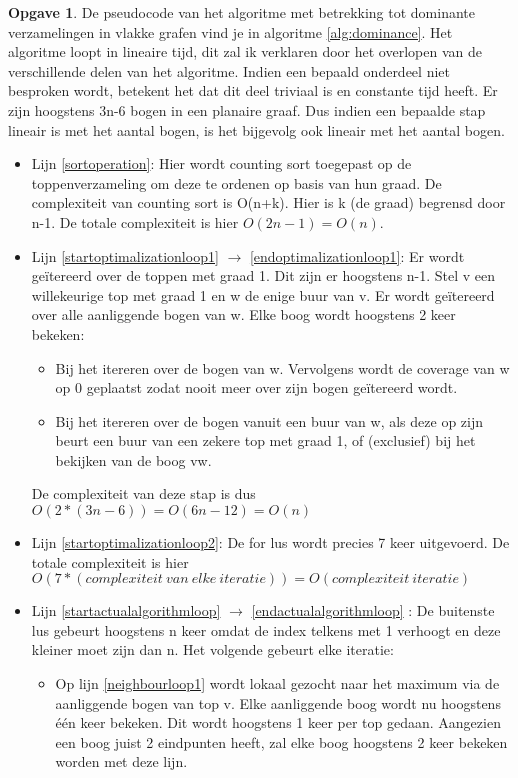\documentclass[11pt, a4paper, table]{article}
\theoremstyle{definition}
\newtheorem{opgave}{Opgave}
\theoremstyle{definition}
\theoremstyle{definition}
\begin{document}
\begin{opgave}
		De pseudocode van het algoritme met betrekking tot dominante verzamelingen in vlakke grafen vind je in algoritme \ref{alg:dominance}. Het algoritme loopt in lineaire tijd, dit zal ik verklaren door het overlopen van de verschillende delen van het algoritme. Indien een bepaald onderdeel niet besproken wordt, betekent het dat dit deel triviaal is en constante tijd heeft. Er zijn hoogstens 3n-6 bogen in een planaire graaf. Dus indien een bepaalde stap lineair is met het aantal bogen, is het bijgevolg ook lineair met het aantal bogen. 
		\begin{itemize}
			 \item Lijn \ref{sortoperation}: Hier wordt counting sort toegepast op de toppenverzameling om deze te ordenen op basis van hun graad. De complexiteit van counting sort is O(n+k). Hier is k (de graad) begrensd door n-1. De totale complexiteit is hier $O(2n-1)=O(n)$.
			 \item Lijn \ref{startoptimalizationloop1} $\rightarrow$ \ref{endoptimalizationloop1}: Er wordt ge\"{i}tereerd over de toppen met graad 1. Dit zijn er hoogstens n-1. 
			 Stel v een willekeurige top met graad 1 en w de enige buur van v.
			 Er wordt ge\"{i}tereerd over alle aanliggende bogen van w. Elke boog wordt hoogstens 2 keer bekeken:
			 \begin{itemize}
			 	\item Bij het itereren over de bogen van w. Vervolgens wordt de coverage van w op 0 geplaatst zodat nooit meer over zijn bogen ge\"{i}tereerd wordt. 
			 	\item Bij het itereren over de bogen vanuit een buur van w, als deze op zijn beurt een buur van een zekere top met graad 1, of (exclusief) bij het bekijken van de boog vw. 
			 \end{itemize}
			 De complexiteit van deze stap is dus $O(2*(3n-6)) = O(6n-12) = O(n)$
			\item Lijn \ref{startoptimalizationloop2}: De for lus wordt precies 7 keer uitgevoerd. De totale complexiteit is hier 
			$O(7*(complexiteit\ van\ elke\ iteratie)) = O(complexiteit \ iteratie)$
			\item Lijn \ref{startactualalgorithmloop} $\rightarrow$ \ref{endactualalgorithmloop} : De buitenste lus gebeurt hoogstens n keer omdat de index telkens met 1 verhoogt en deze kleiner moet zijn dan n. Het volgende gebeurt elke iteratie: 
			\begin{itemize}
				\item Op lijn \ref{neighbourloop1} wordt lokaal gezocht naar het maximum via de aanliggende bogen van top v. Elke aanliggende boog wordt nu hoogstens \'{e}\'{e}n keer bekeken. Dit wordt hoogstens 1 keer per top gedaan. Aangezien een boog juist 2 eindpunten heeft, zal elke boog hoogstens 2 keer bekeken worden met deze lijn. 

\end{itemize}
\end{itemize}
\end{opgave}
\end{document}
